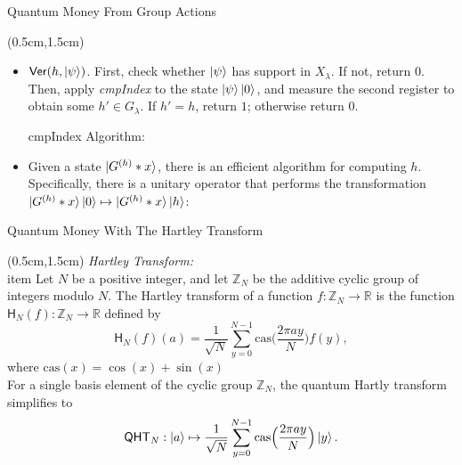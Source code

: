 \documentclass{beamer}
\theoremstyle{definition}
\newcommand{\cas}{\mathrm{cas}}
\newcommand{\cht}{\mathsf{H}}
\newcommand{\qht}{\mathsf{QHT}}
\newcommand{\ver}{\mathsf{Ver}}
\begin{document}
\begin{frame}{Quantum Money From Group Actions}
    
    \begin{textblock*}{12cm}(0.5cm,1.5cm)
            
        
        \begin{itemize}
        \item $\ver(h, \ket{\psi})$. First, check whether $\ket{\psi}$ has support in $X_\lambda$. If not, return $0$. Then, apply \textit{cmpIndex} to the state $\ket{\psi}\ket{0}$, and measure the second register to obtain some $h' \in G_\lambda$. If $h' = h$, return $1$; otherwise return $0$.
        
        \vspace{1.5cm}
        cmpIndex Algorithm:
        \vspace{0.3cm}
        \item  Given a state $\ket{G^{(h)} * x}$, there is an efficient algorithm for computing $h$.
        Specifically, there is a unitary operator that performs the transformation $\ket{G^{(h)} * x} \ket{0} \mapsto \ket{G^{(h)} * x} \ket{h}$:
        \end{itemize}

        
    \end{textblock*}


\end{frame}







\begin{frame}{Quantum Money With The Hartley Transform}
    
    \begin{textblock*}{12cm}(0.5cm,1.5cm)
        \textit{Hartley Transform:}\\
        item Let $N$ be a positive integer, and let $\mathbb{Z}_N$ be the additive cyclic group of integers modulo $N$. The Hartley transform of a function $f: \mathbb{Z}_N \to \mathbb{R}$ is the function $\cht_N(f): \mathbb{Z}_N \to \mathbb{R}$ defined by
        \[ \cht_N(f)(a) = \frac{1}{\sqrt{N}} \sum_{y = 0}^{N - 1} \cas\Big(\frac{2 \pi ay}{N}\Big) f(y),  \]
        where $\cas(x) = \cos(x) + \sin(x)$ \\
        For a single basis element of the cyclic group $\mathbb{Z}_N$, the quantum Hartly transform simplifies to
        \begin{equation}
            \label{eq:qht-N}
            \qht_N: \ket{a} \mapsto \frac{1}{\sqrt{N}} \sum_{y = 0}^{N - 1} \cas\Big(\frac{2\pi a y}{N}\Big) \ket{y}.
        \end{equation}
    \end{textblock*}
    

\end{frame}
\end{document}

